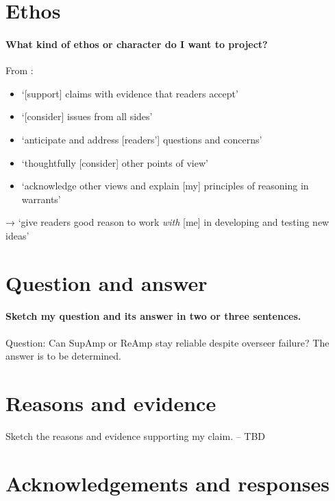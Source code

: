 \documentclass{farlamp}
\begin{document}
\section{Ethos}

\paragraph{What kind of ethos or character do I want to project?} From
\textcite[p. 119]{CoR}:

\begin{itemize}
\item ‘[support] claims with evidence that readers accept’
\item ‘[consider] issues from all sides’
\item ‘anticipate and address [readers'] questions and concerns’
\item ‘thoughtfully [consider] other points of view’
\item ‘acknowledge other views and explain [my] principles of reasoning in
    warrants’
\end{itemize}

→ ‘give readers good reason to work \emph{with} [me] in developing and testing
new ideas’


\section{Question and answer}

\paragraph{Sketch my question and its answer in two or three sentences.}
Question: Can SupAmp or ReAmp stay reliable despite overseer failure?
The answer is to be determined.


\section{Reasons and evidence}

Sketch the reasons and evidence supporting my claim. – TBD


\section{Acknowledgements and responses}
\end{document}
